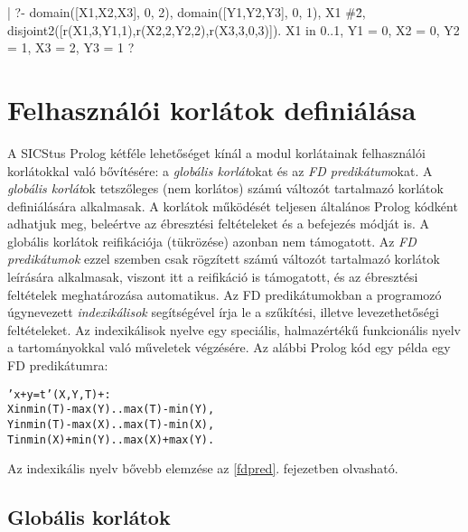 \begin{prologcode}
| ?- domain([X1,X2,X3], 0, 2), domain([Y1,Y2,Y3], 0, 1), X1 #\= 2,
     disjoint2([r(X1,3,Y1,1),r(X2,2,Y2,2),r(X3,3,0,3)]).
X1 in 0..1, Y1 = 0,   X2 = 0, Y2 = 1,   X3 = 2, Y3 = 1 ?
\end{prologcode}

\section{Felhasználói korlátok definiálása}

A SICStus Prolog kétféle lehetőséget kínál a \clpfd modul korlátainak
felhasználói korlátokkal való bővítésére: a \emph{globális korlát}okat és
az \emph{FD predikátum}okat. A \emph{globális korlát}ok tetszőleges (nem korlátos)
számú változót tartalmazó korlátok definiálására alkalmasak. A korlátok
működését teljesen általános Prolog kódként adhatjuk meg, beleértve az
ébresztési feltételeket és a befejezés módját is. A globális korlátok
reifikációja (tükrözése) azonban nem támogatott. Az \emph{FD predikátumok}
ezzel szemben csak rögzített számú változót tartalmazó korlátok leírására
alkalmasak, viszont itt a reifikáció is támogatott, és az ébresztési
feltételek meghatározása automatikus. Az FD predikátumokban a programozó
úgynevezett \emph{indexikálisok} segítségével írja le a szűkítési, illetve
levezethetőségi feltételeket. Az indexikálisok nyelve egy speciális, halmazértékű
funkcionális nyelv a tartományokkal való műveletek végzésére. Az alábbi
Prolog kód egy példa egy FD predikátumra:

\begin{alltt}
% Az X+Y #= T korlát (intervallum szűkítéssel)
'x+y=t'(X,Y,T) +:
        X in min(T) - max(Y)..max(T) - min(Y),
        Y in min(T) - max(X)..max(T) - min(X),
        T in min(X) + min(Y)..max(X) + max(Y).
\end{alltt}

Az indexikális nyelv bővebb elemzése az \ref{fdpred}. fejezetben olvasható.

\subsection{Globális korlátok}

\label{globalis}

